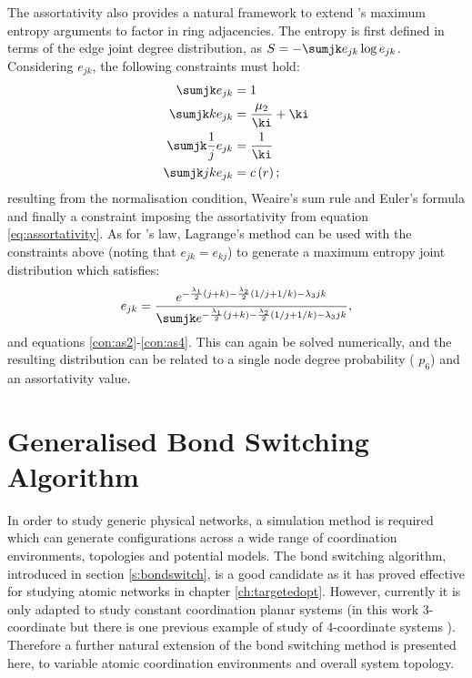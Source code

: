 The assortativity also provides a natural framework to extend \lm's maximum entropy arguments to factor in ring adjacencies.
The entropy is first defined in terms of the edge joint degree distribution, as $S=-\sumjk e_{jk}\log e_{jk}$.
Considering $e_{jk}$, the following constraints must hold:
\begin{align}
        \sumjk e_{jk} &=1 \label{con:as1}\\
        \sumjk ke_{jk} &= \frac{\mu_2}{\ki}+\ki \label{con:as2}\\
        \sumjk \frac{1}{j}e_{jk} &= \frac{1}{\ki} \label{con:as3}\\
        \sumjk jke_{jk} &= c\left(r\right)\label{con:as4};
\end{align}
resulting from the normalisation condition, Weaire's sum rule \cite{Weaire1974} and Euler's formula and finally a constraint imposing the assortativity from equation \eqref{eq:assortativity}.
As for \lm's law, Lagrange's method can be used with the constraints above (noting that $e_{jk}=e_{kj}$) to generate a maximum entropy joint distribution which satisfies:
\begin{equation}
        \label{eq:mer}
        e_{jk} = \frac{e^{-\frac{\lambda_1}{2}\left(j+k\right)-\frac{\lambda_2}{2}\left(1/j+1/k\right)-\lambda_3 jk}}{\sumjk e^{-\frac{\lambda_1}{2}\left(j+k\right)-\frac{\lambda_2}{2}\left(1/j+1/k\right)-\lambda_3 jk}},
\end{equation}
and equations \eqref{con:as2}\--\eqref{con:as4}.
This can again be solved numerically, and the resulting distribution can be related to a single node degree probability (\eg{} $p_6$) and an assortativity value.

\section{Generalised Bond Switching Algorithm}

In order to study generic physical networks, a simulation method is required which can generate configurations across a wide range of coordination environments, topologies and potential models. 
The bond switching algorithm, introduced in section \ref{s:bondswitch}, is a good candidate as it has proved effective for studying atomic networks in chapter \ref{ch:targetedopt}.
However, currently it is only adapted to study constant coordination planar systems (in this work 3\--coordinate but there is one previous example of study of 4\--coordinate systems \cite{Greneche1990}).
Therefore a further natural extension of the bond switching method is presented here, to variable atomic coordination environments and overall system topology.

